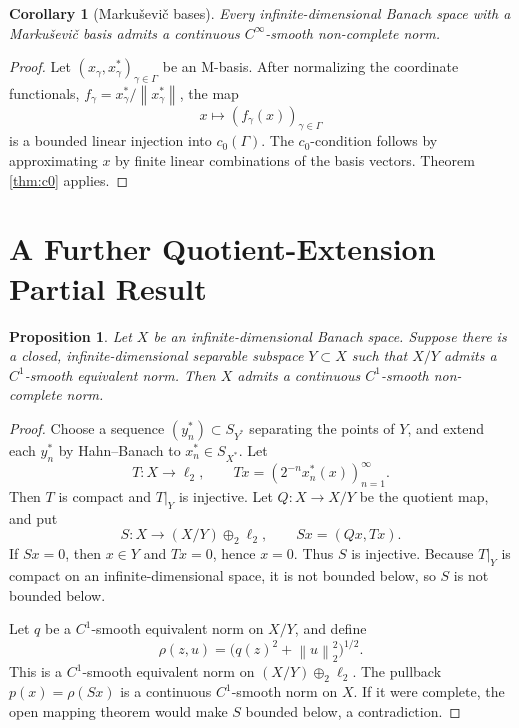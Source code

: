 \documentclass[11pt]{article}
\newtheorem{proposition}{Proposition}
\newtheorem{corollary}{Corollary}
\theoremstyle{remark}
\newcommand{\norm}[1]{\left\lVert #1 \right\rVert}
\begin{document}
\begin{corollary}[Marku\v{s}evi\v{c} bases]
Every infinite-dimensional Banach space with a Marku\v{s}evi\v{c} basis admits
a continuous \(C^\infty\)-smooth non-complete norm.
\end{corollary}

\begin{proof}
Let \((x_\gamma,x_\gamma^*)_{\gamma\in\Gamma}\) be an M-basis.  After
normalizing the coordinate functionals, \(f_\gamma=x_\gamma^*/\norm{x_\gamma^*}\),
the map
\[
        x\longmapsto (f_\gamma(x))_{\gamma\in\Gamma}
\]
is a bounded linear injection into \(c_0(\Gamma)\).  The \(c_0\)-condition
follows by approximating \(x\) by finite linear combinations of the basis
vectors.  Theorem \ref{thm:c0} applies.
\end{proof}

\section*{A Further Quotient-Extension Partial Result}

\begin{proposition}
\label{prop:quotient}
Let \(X\) be an infinite-dimensional Banach space.  Suppose there is a closed,
infinite-dimensional separable subspace \(Y\subset X\) such that \(X/Y\) admits
a \(C^1\)-smooth equivalent norm.  Then \(X\) admits a continuous
\(C^1\)-smooth non-complete norm.
\end{proposition}

\begin{proof}
Choose a sequence \((y_n^*)\subset S_{Y^*}\) separating the points of \(Y\),
and extend each \(y_n^*\) by Hahn--Banach to \(x_n^*\in S_{X^*}\).  Let
\[
        T:X\to\ell_2,\qquad
        Tx=(2^{-n}x_n^*(x))_{n=1}^\infty.
\]
Then \(T\) is compact and \(T|_Y\) is injective.  Let \(Q:X\to X/Y\) be the
quotient map, and put
\[
        S:X\to (X/Y)\oplus_2\ell_2,\qquad Sx=(Qx,Tx).
\]
If \(Sx=0\), then \(x\in Y\) and \(Tx=0\), hence \(x=0\).  Thus \(S\) is
injective.  Because \(T|_Y\) is compact on an infinite-dimensional space, it is
not bounded below, so \(S\) is not bounded below.

Let \(q\) be a \(C^1\)-smooth equivalent norm on \(X/Y\), and define
\[
        \rho(z,u)=\bigl(q(z)^2+\norm{u}_2^2\bigr)^{1/2}.
\]
This is a \(C^1\)-smooth equivalent norm on \((X/Y)\oplus_2\ell_2\).  The
pullback \(p(x)=\rho(Sx)\) is a continuous \(C^1\)-smooth norm on \(X\).  If it
were complete, the open mapping theorem would make \(S\) bounded below, a
contradiction.
\end{proof}
\end{document}
